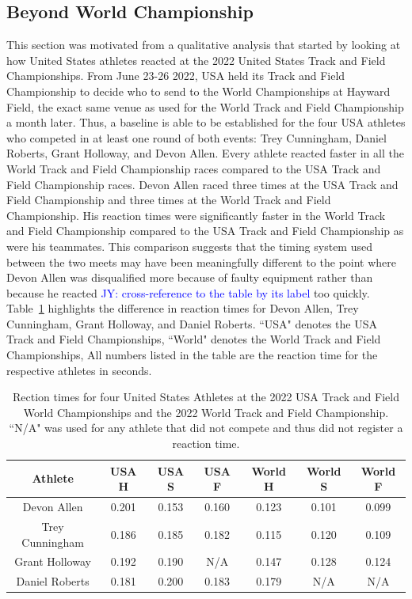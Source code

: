 \documentclass[12pt, letterpaper, titlepage]{article}
\newcommand{\jy}[1]{\textcolor{blue}{JY: #1}}
\begin{document}
\subsection{Beyond World Championship}
This section was motivated from a qualitative analysis that started by looking
at how United States athletes reacted at the 2022 United States Track and Field
Championships. From June 23-26 2022, USA held its Track
and Field Championship to decide who to send to the World Championships at Hayward 
Field, the exact same venue as used for the World Track and Field Championship a month 
later.  Thus, a baseline is able to be established for the four USA athletes who 
competed in at least one round of both events: Trey Cunningham, Daniel Roberts, 
Grant Holloway, and Devon Allen. Every athlete reacted faster in all the World 
Track and Field Championship races compared to the USA Track and Field 
Championship races. Devon Allen raced three times at the USA Track and
Field Championship and three times at the World Track and Field  Championship. 
His reaction times were significantly faster in the World Track and
Field Championship compared to the USA Track and Field Championship as were his
teammates.  This comparison suggests that the timing system used between the two
meets may have been meaningfully different to the point where Devon Allen was
disqualified more because of faulty equipment rather than because he reacted
\jy{cross-reference to the table by its label}
too quickly.  Table~\ref{fig:USAvsWorld} highlights the difference in reaction times for
Devon Allen, Trey Cunningham, Grant Holloway, and Daniel Roberts. ``USA" denotes
the USA Track and Field Championships, ``World" denotes the World Track and Field
Championships,   All numbers listed in the table are the reaction
time for the respective athletes in seconds. 

\begin{table}
\begin{center}
  \begin{tabular}{c c c c c c c} 
   \toprule
   Athlete & USA H & USA S & USA F & World H & World S & World F \\ [0.5ex] 
   \midrule
   Devon Allen & 0.201 & 0.153 & 0.160 & 0.123 & 0.101 & 0.099 \\ 
   Trey Cunningham & 0.186 & 0.185 & 0.182 & 0.115 & 0.120 & 0.109 \\
   Grant Holloway & 0.192 & 0.190 & N/A & 0.147 & 0.128 & 0.124 \\
   Daniel Roberts & 0.181 & 0.200 & 0.183 & 0.179 & N/A & N/A \\ [0.5ex]
   \bottomrule
  \end{tabular}
  \label{fig:USAvsWorld}
  \caption{Rection times for four United States Athletes at the 2022 USA Track
  and Field World Championships and the 2022 World Track and Field Championship.
  ``N/A" was used for any athlete that did not compete and thus did not register 
  a reaction time.}
  \end{center}
\end{table}
\end{document}
